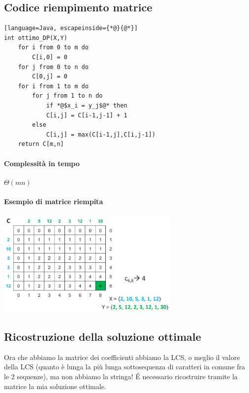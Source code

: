 \subsection*{Codice riempimento matrice}
\begin{lstlisting}[language=Java, escapeinside={*@}{@*}]
int ottimo_DP(X,Y)
    for i from 0 to m do
        C[i,0] = 0
    for j from 0 to n do
        C[0,j] = 0
    for i from 1 to m do
        for j from 1 to n do
            if *@$x_i = y_j$@* then
            C[i,j] = C[i-1,j-1] + 1
        else
            C[i,j] = max(C[i-1,j],C[i,j-1])
    return C[m,n]
\end{lstlisting}
\paragraph*{Complessità in tempo} $\Theta (mn)$
\paragraph*{Esempio di matrice riempita}
\begin{center}
    \includegraphics[width=90mm, scale=0.5]{chapters_ulerich/img/LCS_matrix_riempita.png}
\end{center}
\subsection{Ricostruzione della soluzione ottimale}
Ora che abbiamo la matrice dei coefficienti abbiamo la LCS, o meglio il valore della
LCS (quanto è lunga la più lunga sottosequenza di caratteri in comune fra le 2 sequenze), ma
non abbiamo la stringa! \'E necessario ricostruire tramite la matrice la mia soluzione ottimale.

